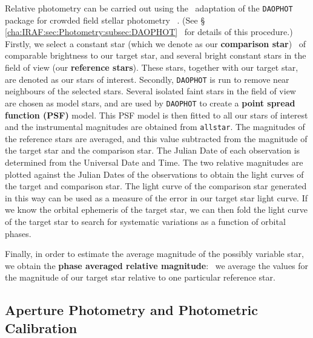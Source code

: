 Relative photometry can be carried out using the \iraf\ adaptation of the \texttt{DAOPHOT} package for crowded field stellar photometry%
\ \cite{Stetson:1987}. %
(See \S~%
\vref{cha:IRAF:sec:Photometry:subsec:DAOPHOT}%
\ for details of this procedure.) %
Firstly, we select a constant star (which we denote as our \textbf{comparison star})%
\label{cha:InfraredDataReductionTechniques:sec:Photometry:subsec:RelativePhotometry:topic:comparison}%
\ of comparable brightness to our target star, and several bright constant stars in the field of view (our \textbf{reference stars}). These stars, together with our target star, are denoted as our stars of
interest. Secondly, \texttt{DAOPHOT} is run to remove near neighbours of the selected
stars. Several isolated faint stars in the field of view are chosen
as model stars, and are used by \texttt{DAOPHOT} to create a
\textbf{point spread function (PSF)} model. 
This PSF model is then fitted to all our stars of interest and the instrumental magnitudes are obtained from \texttt{allstar}. The magnitudes of the reference stars are averaged, and this value
subtracted from the magnitude of the target star and the comparison star.  The
Julian Date of each observation is determined from the Universal Date
and Time. The two relative magnitudes are plotted against the Julian Dates of
the observations to obtain the light curves of the target and
comparison star. The light curve of the comparison star generated in this way can be used as a measure of the error in our target star light curve. If we know the orbital ephemeris of the target star, we can then fold the light curve of the target star to search for systematic variations as a function of orbital phases. %

\vspace{\myparskip}

Finally, in order to estimate the average magnitude of the possibly
variable star, we obtain the \textbf{phase averaged relative
magnitude}:%
\label{cha:InfraredDataReductionTechniques:sec:Photometry:subsec:RelativePhotometry:topic:parm}%
\ we average the values for the magnitude of our target star
relative to one particular reference star. 


\subsection{Aperture Photometry and Photometric Calibration}
\label{cha:InfraredDataReductionTechniques:sec:Photometry:subsec:AperturePhotometry}

